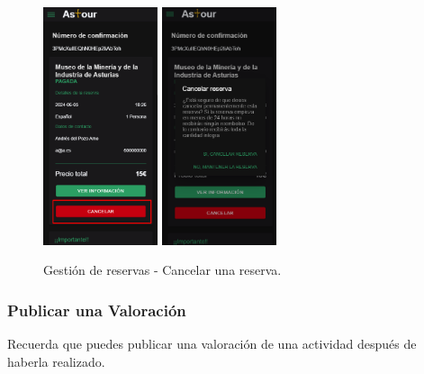 \begin{enumerate}
\begin{figure}[H]
		      \includegraphics[width=0.3\textwidth]{7-Construccion/Manuales/mobile/cancelar reserva.png}
		      \includegraphics[width=0.3\textwidth]{7-Construccion/Manuales/mobile/confirmar cancelacion reserva.png}
		      \caption{Gestión de reservas - Cancelar una reserva.}
	      \end{figure}
\end{enumerate}

\subsubsection{Publicar una Valoración}
Recuerda que puedes publicar una valoración de una actividad después de haberla realizado.

